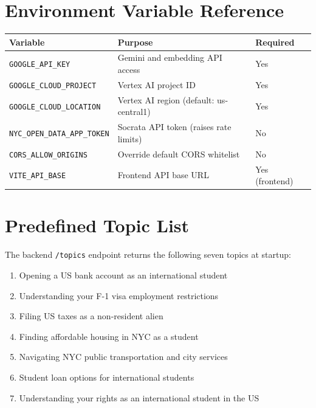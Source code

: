 \documentclass[12pt, letterpaper]{article}
\begin{document}
\newpage

\appendix
\section{Environment Variable Reference}

\begin{center}
\begin{tabularx}{\textwidth}{lXl}
\toprule
\textbf{Variable} & \textbf{Purpose} & \textbf{Required} \\
\midrule
\texttt{GOOGLE\_API\_KEY}          & Gemini and embedding API access            & Yes \\
\texttt{GOOGLE\_CLOUD\_PROJECT}    & Vertex AI project ID                       & Yes \\
\texttt{GOOGLE\_CLOUD\_LOCATION}   & Vertex AI region (default: us-central1)    & Yes \\
\texttt{NYC\_OPEN\_DATA\_APP\_TOKEN} & Socrata API token (raises rate limits)   & No \\
\texttt{CORS\_ALLOW\_ORIGINS}      & Override default CORS whitelist            & No \\
\texttt{VITE\_API\_BASE}           & Frontend API base URL                      & Yes (frontend) \\
\bottomrule
\end{tabularx}
\end{center}

\section{Predefined Topic List}

The backend \texttt{/topics} endpoint returns the following seven topics at startup:

\begin{enumerate}[leftmargin=2em]
  \item Opening a US bank account as an international student
  \item Understanding your F-1 visa employment restrictions
  \item Filing US taxes as a non-resident alien
  \item Finding affordable housing in NYC as a student
  \item Navigating NYC public transportation and city services
  \item Student loan options for international students
  \item Understanding your rights as an international student in the US
\end{enumerate}
\end{document}
